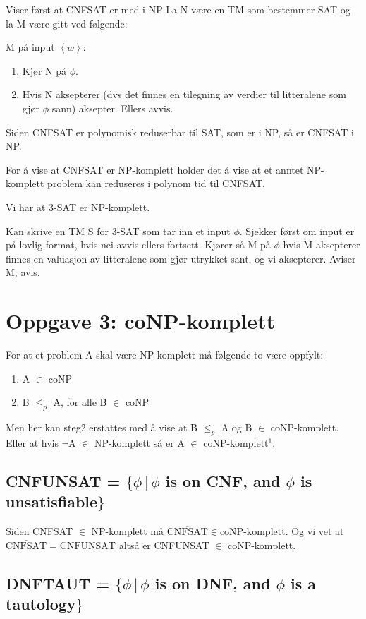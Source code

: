 \documentclass{article}
\begin{document}
Viser først at CNFSAT er med i NP
La N være en TM som bestemmer SAT og la  M være gitt ved følgende:

M på input $\left<w\right>$:
\begin{enumerate}
\item Kjør N på $\phi$.
\item Hvis N aksepterer (dvs det finnes en tilegning av verdier til litteralene som gjør $\phi$ sann) aksepter. Ellers avvis.
\end{enumerate}
Siden CNFSAT er polynomisk reduserbar til SAT, som er i NP, så er CNFSAT i NP.


For å vise at CNFSAT er NP-komplett holder det å vise at et anntet NP-komplett problem kan reduseres i polynom tid til CNFSAT.

Vi har at 3-SAT er NP-komplett.

Kan skrive en TM S for 3-SAT som tar inn et input $\phi$. Sjekker først om input er på lovlig format, hvis nei avvis ellers fortsett. Kjører så M på $\phi$ hvis M aksepterer finnes en valuasjon av litteralene som gjør utrykket sant, og vi aksepterer. Aviser M, avis.



\section*{Oppgave 3: coNP-komplett}
For at et problem A skal være NP-komplett må følgende to være oppfylt:
\begin{enumerate}
\item A $\in $ coNP
\item B $\leq_p $ A, \quad for alle B $\in$ coNP
\end{enumerate}

Men her kan steg2 erstattes med å vise at B $\leq_p $ A og B $\in$ coNP-komplett. Eller at hvis $\neg$A $\in$ NP-komplett så er A $\in$ coNP-komplett$^1$.


\subsection*{CNFUNSAT = $\{\phi \, |  \, \phi $ is on CNF, and $\phi$ is unsatisfiable$\}$}

Siden CNFSAT $\in$ NP-komplett må $\overline{\text{CNFSAT}} \in \text{coNP-komplett}$.
Og vi vet at $\overline{\text{CNFSAT}} = \text{CNFUNSAT}$ altså er CNFUNSAT $\in $ coNP-komplett.



\subsection*{DNFTAUT = $\{\phi \, |  \, \phi $ is on DNF, and $\phi$ is a tautology$\}$}
\end{document}
